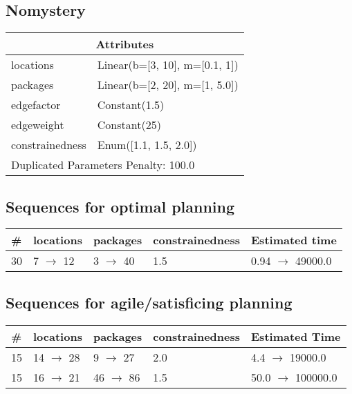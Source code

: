 \documentclass{article}
\begin{document}
                            \newpage \subsection{Nomystery}
                    \begin{center}
                    \begin{tabular}{@{}p{}p{}@{}}
                    \multicolumn{2}{c}{\bf \large Attributes}\\\midrule
                    locations & Linear(b=[3, 10], m=[0.1, 1])\\
packages & Linear(b=[2, 20], m=[1, 5.0])\\
edgefactor & Constant(1.5)\\
edgeweight & Constant(25)\\
constrainedness & Enum([1.1, 1.5, 2.0]) \\\midrule
                    \multicolumn{2}{l}{Duplicated Parameters Penalty: 100.0}
                    \end{tabular}
                    \end{center}
                
                            \subsection*{Sequences for optimal planning}

                            \begin{center}
                            \begin{tabular}{@{}l|l|l|l|l@{}}
                            \# & locations & packages & constrainedness & Estimated time\\\midrule
                            30&7 $\rightarrow$ 12&3 $\rightarrow$ 40&1.5&0.94 $\rightarrow$ 49000.0
                            \end{tabular}
                            \end{center}
                    
                         \subsection*{Sequences for agile/satisficing planning}

                        \begin{center}
                        \begin{tabular}{@{}l|l|l|l|l@{}}
                        \# & locations & packages & constrainedness & Estimated Time\\\midrule
                        15&14 $\rightarrow$ 28&9 $\rightarrow$ 27&2.0&4.4 $\rightarrow$ 19000.0\\
15&16 $\rightarrow$ 21&46 $\rightarrow$ 86&1.5&50.0 $\rightarrow$ 100000.0
                        \end{tabular}
                        \end{center}
                    
\end{document}
